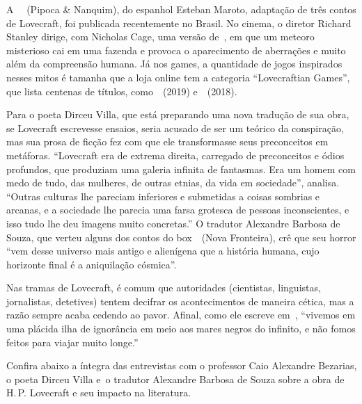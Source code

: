 \begin{changemargin}
A  {} (Pipoca \& Nanquim), do espanhol Esteban Maroto, adaptação de três contos de Lovecraft, foi publicada recentemente no Brasil. No cinema, o diretor Richard Stanley dirige, com Nicholas Cage, uma versão de {}, em que um meteoro misterioso cai em uma fazenda e provoca o aparecimento de aberrações e muito além da compreensão humana. Já nos games, a quantidade de jogos inspirados nesses mitos é tamanha que a loja online {} tem a categoria “Lovecraftian Games”, que lista centenas de títulos, como {} (2019) e {} (2018). 

Para o poeta Dirceu Villa, que está preparando uma nova tradução de sua obra, se Lovecraft escrevesse ensaios, seria acusado de ser um teórico da conspiração, mas sua prosa de ficção fez com que ele transformasse seus preconceitos em metáforas. “Lovecraft era de extrema direita, carregado de preconceitos e ódios profundos, que produziam uma galeria infinita de fantasmas. Era um homem com medo de tudo, das mulheres, de outras etnias, da vida em sociedade”, analisa. “Outras culturas lhe pareciam inferiores e submetidas a coisas sombrias e arcanas, e a sociedade lhe parecia uma farsa grotesca de pessoas inconscientes, e isso tudo lhe deu imagens muito concretas.” O tradutor Alexandre Barbosa de Souza, que verteu alguns dos contos do box {} (Nova Fronteira), crê que seu horror “vem desse universo mais antigo e alienígena que a história humana, cujo horizonte final é a aniquilação cósmica”.

Nas tramas de Lovecraft, é comum que autoridades (cientistas, linguistas, jornalistas, detetives) tentem decifrar os acontecimentos de maneira cética, mas a razão sempre acaba cedendo ao pavor. Afinal, como ele escreve em {}, “vivemos em uma plácida ilha de ignorância em meio aos mares negros do infinito, e não fomos feitos para viajar muito longe.”

Confira abaixo a íntegra das entrevistas com o professor Caio Alexandre Bezarias, o poeta Dirceu Villa e o tradutor Alexandre Barbosa de Souza sobre a obra de H.\,P. Lovecraft e seu impacto na literatura.

\bigskip
\bigskip


\bigskip



\end{changemargin}
